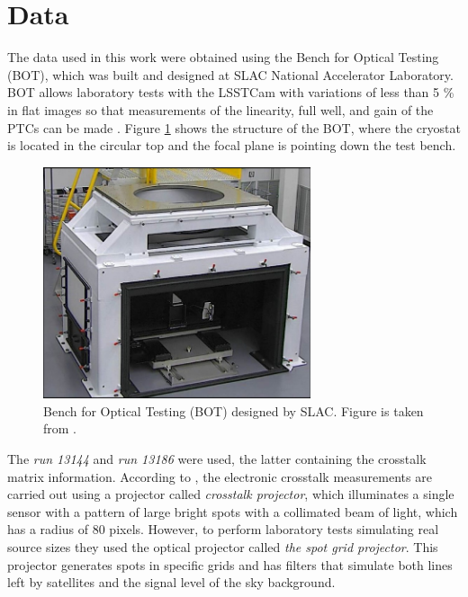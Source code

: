 \section{Data} \label{sec:data}

The data used in this work were obtained using the Bench for Optical Testing (BOT), which was built and designed at SLAC National Accelerator Laboratory. BOT allows laboratory tests with the LSSTCam with variations of less than 5 \% in flat images so that measurements of the linearity, full well, and gain of the PTCs can be made \citep{newbry2018lsst}. Figure \ref{fig:BOT_stand} shows the structure of the BOT, where the cryostat is located in the circular top and the focal plane is pointing down the test bench. 



\begin{figure}[!htb]
    \centering
    \includegraphics[width=0.7\textwidth]{Figures/BOT_stand.png}
    \caption{Bench for Optical Testing (BOT) designed by SLAC. Figure is taken from \cite{newbry2018lsst}. }
    \label{fig:BOT_stand}
\end{figure}

The \textit{run 13144} and \textit{run 13186} were used, the latter containing the crosstalk matrix information. According to \cite{snyder2020laboratory}, the electronic crosstalk measurements are carried out using a projector called \textit{crosstalk projector}, which illuminates a single sensor with a pattern of large bright spots with a collimated beam of light, which has a radius of 80 pixels. However, to perform laboratory tests simulating real source sizes they used the optical projector called \textit{the spot grid projector}. This projector generates spots in specific grids and has filters that simulate both lines left by satellites and the signal level of the sky background.

